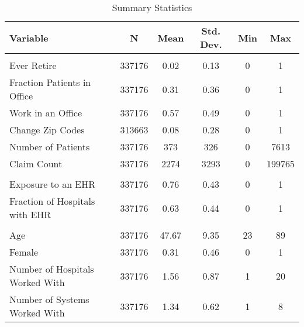 


\begin{table}[h]
\caption{Summary Statistics}
\centering
\begin{tabular}[t]{lccccc}
\toprule
Variable & N & Mean & Std. Dev. & Min & Max\\
\midrule
\addlinespace[0.3em]
\multicolumn{6}{l}{\textbf{Outcomes}}\\
\hspace{1em}Ever Retire & 337176 & 0.02 & 0.13 & 0 & 1\\
\hspace{1em}Fraction Patients in Office & 337176 & 0.31 & 0.36 & 0 & 1\\
\hspace{1em}Work in an Office & 337176 & 0.57 & 0.49 & 0 & 1\\
\hspace{1em}Change Zip Codes & 313663 & 0.08 & 0.28 & 0 & 1\\
\hspace{1em}Number of Patients & 337176 & 373 & 326 & 0 & 7613\\
\hspace{1em}Claim Count & 337176 & 2274 & 3293 & 0 & 199765\\
\addlinespace[0.3em]
\multicolumn{6}{l}{\textbf{Treatment}}\\
\hspace{1em}Exposure to an EHR & 337176 & 0.76 & 0.43 & 0 & 1\\
\hspace{1em}Fraction of Hospitals with EHR & 337176 & 0.63 & 0.44 & 0 & 1\\
\addlinespace[0.3em]
\multicolumn{6}{l}{\textbf{Characteristics}}\\
\hspace{1em}Age & 337176 & 47.67 & 9.35 & 23 & 89\\
\hspace{1em}Female & 337176 & 0.31 & 0.46 & 0 & 1\\
\hspace{1em}Number of Hospitals Worked With & 337176 & 1.56 & 0.87 & 1 & 20\\
\hspace{1em}Number of Systems Worked With & 337176 & 1.34 & 0.62 & 1 & 8\\
\bottomrule
\end{tabular}
\label{tab:sumstats1}
\end{table}